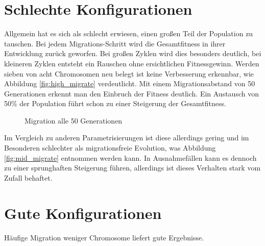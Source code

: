 \documentclass[12pt,a4paper]{article}
\begin{document}
\section{Schlechte Konfigurationen}
Allgemein hat es sich als schlecht erwiesen, einen großen Teil der Population zu tauschen. Bei jedem Migrations-Schritt wird die Gesamtfitness in ihrer Entwicklung zurück geworfen. Bei großen Zyklen wird dies besonders deutlich, bei kleineren Zyklen entsteht ein Rauschen ohne ersichtlichen Fitnessgewinn. Werden sieben von acht Chromosomen neu belegt ist keine Verbesserung erkennbar, wie Abbildung \ref{fig:high_migrate} verdeutlicht. Mit einem Migrationsabstand von 50 Generationen erkennt man den Einbruch der Fitness deutlich.
Ein Austausch von 50\% der Population führt schon zu einer Steigerung der Gesamtfitness.
\begin{figure}
\centering
	 \caption{Migration alle 50 Generationen}
\end{figure}
Im Vergleich zu anderen Parametrisierungen ist diese allerdings gering und im Besonderen schlechter als migrationsfreie Evolution, was Abbildung \ref{fig:mid_migrate} entnommen werden kann. In Ausnahmefällen kann es dennoch zu einer sprunghaften Steigerung führen, allerdings ist dieses Verhalten stark vom Zufall behaftet.

\section{Gute Konfigurationen}
Häufige Migration weniger Chromosome liefert gute Ergebnisse.
\end{document}
